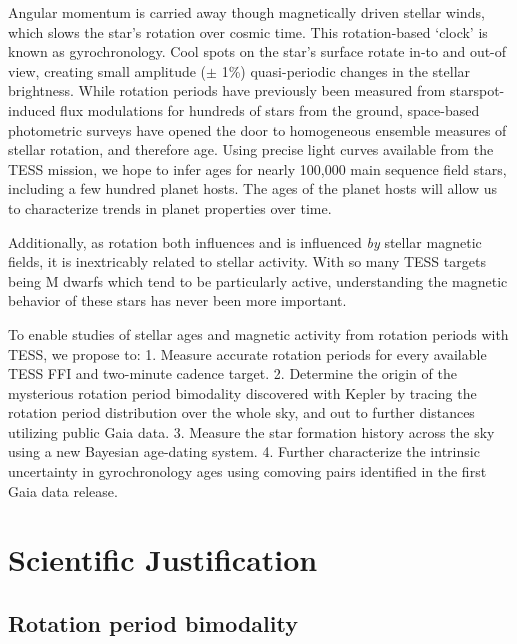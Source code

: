 \documentclass[useAMS, usenatbib, preprint, 12pt]{aastex}
\begin{document}
Angular momentum is carried away though magnetically driven stellar winds,
which slows the star’s rotation over cosmic time.
This rotation-based `clock' is known as gyrochronology.
Cool spots on the star’s surface rotate in-to and out-of view, creating small
amplitude ($\pm$ 1\%) quasi-periodic changes in the stellar brightness.
While rotation periods have previously been measured from starspot-induced
flux modulations for hundreds of stars from the ground, space-based
photometric surveys have opened the door to homogeneous ensemble measures of
stellar rotation, and therefore age.
Using precise light curves available from the TESS mission, we hope to
infer ages for nearly 100,000 main sequence field stars, including a few
hundred planet hosts.
The ages of the planet hosts will allow us to characterize trends in planet
properties over time.

Additionally, as rotation both influences and is influenced {\it by} stellar
magnetic fields, it is inextricably related to stellar activity.
With so many TESS targets being M dwarfs which tend to be particularly active,
understanding the magnetic behavior of these stars has never been more
important.

To enable studies of stellar ages and magnetic activity from rotation periods
with TESS, we propose to:
1. Measure accurate rotation periods for every available TESS FFI and
two-minute cadence target.
2. Determine the origin of the mysterious rotation period bimodality
discovered with Kepler by tracing the rotation period distribution over the
whole sky, and out to further distances utilizing public Gaia data.
3. Measure the star formation history across the sky using a new Bayesian
age-dating system.
4. Further characterize the intrinsic uncertainty in gyrochronology ages using
comoving pairs identified in the first Gaia data release.

\section{Scientific Justification}
\subsection{Rotation period bimodality}
\end{document}
